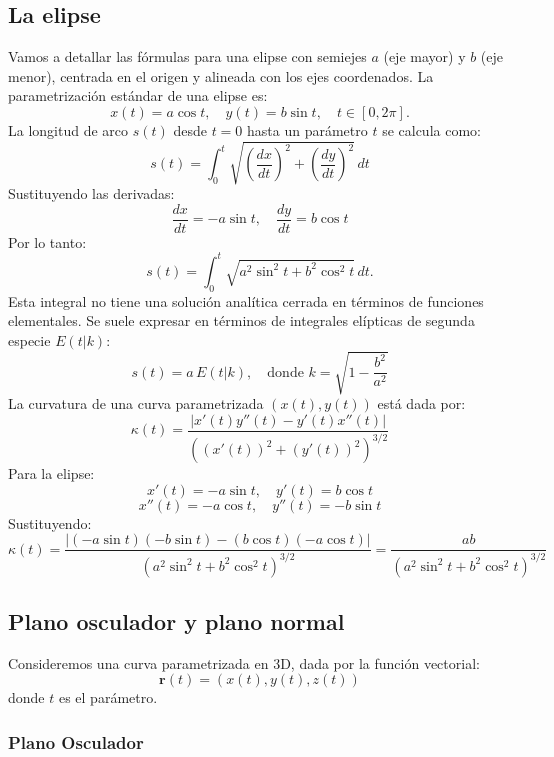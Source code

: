 \documentclass[11pt]{book}
\theoremstyle{definicion}
\theoremstyle{teorema}
\theoremstyle{ejemplo}
\begin{document}
\subsection{La elipse}

\noindent
Vamos a detallar las fórmulas para una elipse con semiejes \(a\) (eje mayor) y \(b\) (eje menor), centrada en el origen y alineada con los ejes coordenados.
%
%
La parametrización estándar de una elipse es:
\[
x(t) = a \cos t, \quad y(t) = b \sin t, \quad t \in [0, 2\pi].
\]
%
%
La longitud de arco \(s(t)\) desde \(t=0\) hasta un parámetro \(t\) se calcula como:
\[
s(t) = \int_{0}^{t} \sqrt{\left(\frac{dx}{dt}\right)^2 + \left(\frac{dy}{dt}\right)^2} \, dt
\]
Sustituyendo las derivadas:
\[
\frac{dx}{dt} = -a \sin t, \quad \frac{dy}{dt} = b \cos t
\]
Por lo tanto:
\[
s(t) = \int_{0}^{t} \sqrt{a^2 \sin^2 t + b^2 \cos^2 t} \, dt.
\]
Esta integral no tiene una solución analítica cerrada en términos de funciones elementales. Se suele expresar en términos de integrales elípticas de segunda especie \(E(t|k)\):
\[
s(t) = a \, E(t|k), \quad \text{donde } k = \sqrt{1 - \frac{b^2}{a^2}}
\]
%
%
La curvatura de una curva parametrizada \((x(t), y(t))\) está dada por:
\[
\kappa(t) = \frac{|x'(t)y''(t) - y'(t)x''(t)|}{\left( (x'(t))^2 + (y'(t))^2 \right)^{3/2}}
\]
Para la elipse:
\[
x'(t) = -a \sin t, \quad y'(t) = b \cos t
\]
\[
x''(t) = -a \cos t, \quad y''(t) = -b \sin t
\]
Sustituyendo:
\[
\kappa(t) = \frac{|(-a \sin t)(-b \sin t) - (b \cos t)(-a \cos t)|}{\left(a^2 \sin^2 t + b^2 \cos^2 t\right)^{3/2}} = \frac{ab}{\left(a^2 \sin^2 t + b^2 \cos^2 t\right)^{3/2}}
\]

\subsection{Plano osculador y plano normal}

\noindent
Consideremos una curva parametrizada en 3D, dada por la función vectorial:
\begin{equation*}
\mathbf{r}(t) = (x(t), y(t), z(t))
\end{equation*}
donde \( t \) es el parámetro.
\subsubsection{Plano Osculador}
\end{document}
